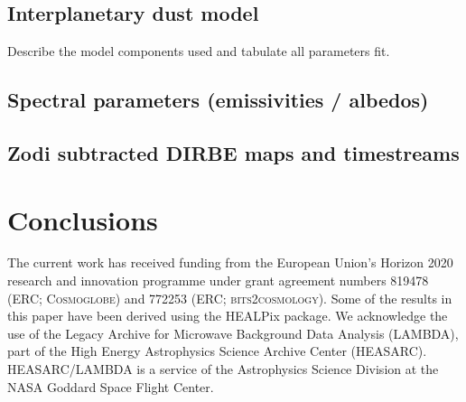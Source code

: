 \documentclass{aa}
\begin{document}
\subsection{Interplanetary dust model}
Describe the model components used and tabulate all parameters fit.

\subsection{Spectral parameters (emissivities / albedos)}

\subsection{Zodi subtracted DIRBE maps and timestreams}

\section{Conclusions}


\begin{acknowledgements}
 The current work has received funding from the European
  Union’s Horizon 2020 research and innovation programme under grant
  agreement numbers 819478 (ERC; \textsc{Cosmoglobe}) and 772253 (ERC;
  \textsc{bits2cosmology}). Some of the results in this paper have been derived using the HEALPix \citep{HEALPIX} package.
  We acknowledge the use of the Legacy Archive for Microwave Background Data
  Analysis (LAMBDA), part of the High Energy Astrophysics Science Archive Center
  (HEASARC). HEASARC/LAMBDA is a service of the Astrophysics Science Division at
  the NASA Goddard Space Flight Center.  
\end{acknowledgements}


%



\end{document}
